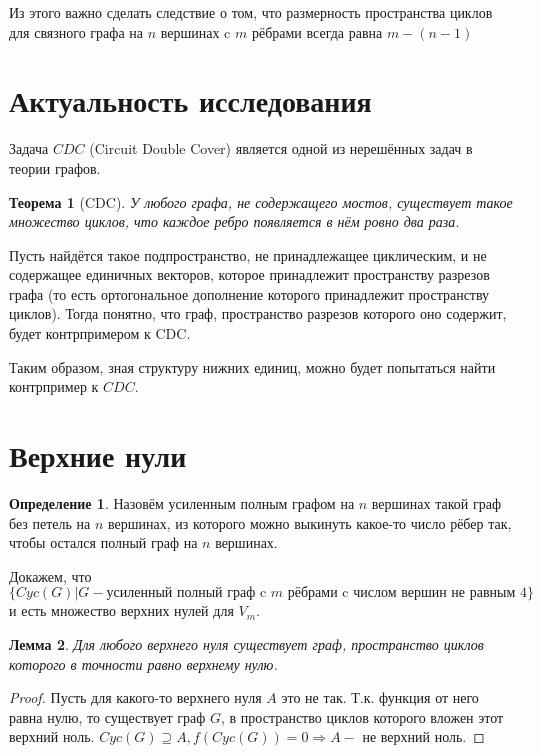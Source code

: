 \documentclass[a4paper]{article}
\newtheorem{theorem}{Теорема}[section]
\newtheorem{lemma}[theorem]{Лемма}
\theoremstyle{definition}
\newtheorem{definition}{Определение}[section]
\begin{document}
Из этого важно сделать следствие о том, что размерность пространства циклов для связного графа на $n$ вершинах c $m$ рёбрами всегда равна $m - (n - 1)$

\section{Актуальность исследования}

Задача $CDC$ (Circuit Double Cover) является одной из нерешённых задач в теории графов.

\begin{theorem}
	[CDC] У любого графа, не содержащего мостов, существует такое множество циклов, что каждое ребро появляется в нём ровно два раза.
\end{theorem}

Пусть найдётся такое подпространство, не принадлежащее циклическим, и не содержащее единичных векторов, которое принадлежит пространству разрезов графа (то есть ортогональное дополнение которого принадлежит пространству циклов). Тогда понятно, что граф, пространство разрезов которого оно содержит, будет контрпримером к CDC.

Таким образом, зная структуру нижних единиц, можно будет попытаться найти контрпример к $CDC$.

\section{Верхние нули}

\begin{definition}
	Назовём усиленным полным графом на $n$ вершинах такой граф без петель на $n$ вершинах, из которого можно выкинуть какое-то число рёбер так, чтобы остался полный граф на $n$ вершинах.
\end{definition}

Докажем, что \\$\{ Cyc(G) | G - {\text{усиленный полный граф c $m$ рёбрами c числом вершин не равным 4}} \}$ и есть множество верхних нулей для $V_m$.

\begin{lemma}
	Для любого верхнего нуля существует граф, пространство циклов которого в точности равно верхнему нулю.
\end{lemma}
\begin{proof}
	Пусть для какого-то верхнего нуля $A$ это не так. Т.к. функция от него равна нулю, то существует граф $G$, в пространство циклов которого вложен этот верхний ноль. $Cyc(G) \supseteq A, f(Cyc(G)) = 0 \Rightarrow A - $ не верхний ноль.
\end{proof}
\end{document}
